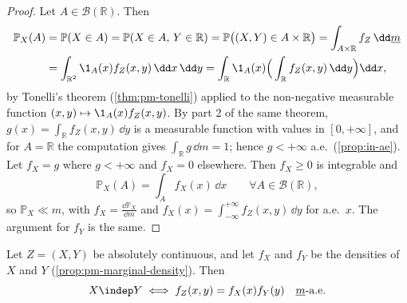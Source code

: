 \begin{proof}
Let $A\in\mathcal B(\mathbb R)$. Then
\[
\begin{aligned}
  \mathbb P_X(A)&=\mathbb P(X\in A)=\mathbb P(X\in A,\,Y\in\mathbb R)=\mathbb P\big((X,Y)\in A\times\mathbb R\big)
  =\int_{A\times\mathbb R}f_Z\,\dd\underline m\\
  &=\int_{\mathbb R^2}\1_A(x)f_Z(x,y)\,\dd x\,\dd y
  =\int_{\mathbb R}\1_A(x)\Big(\int_{\mathbb R}f_Z(x,y)\,\dd y\Big)\dd x,
\end{aligned}
\]
by Tonelli's theorem (\cref{thm:pm-tonelli}) applied to the non-negative measurable function
$(x,y)\mapsto\1_A(x)f_Z(x,y)$. By part 2 of the same theorem,
$g(x)=\int_{\mathbb R}f_Z(x,y)\,\dd y$ is a measurable function with values in $[0,+\infty]$, and
for $A=\mathbb R$ the computation gives $\int_{\mathbb R}g\,\dd m=1$; hence $g<+\infty$ a.e.\
(\cref{prop:in-ae}). Let $f_X=g$ where $g<+\infty$ and $f_X=0$ elsewhere. Then $f_X\ge0$ is
integrable and
\[
  \mathbb P_X(A)=\int_Af_X(x)\,\dd x\qquad\forall A\in\mathcal B(\mathbb R),
\]
so $\mathbb P_X\ll m$, with $f_X=\frac{\dd\mathbb P_X}{\dd m}$ and
$f_X(x)=\int_{-\infty}^{+\infty}f_Z(x,y)\,\dd y$ for a.e.\ $x$. The argument for $f_Y$ is the
same.
\end{proof}

\begin{proposition}\label{thm:pm-density-independence}
Let $Z=(X,Y)$ be absolutely continuous, and let $f_X$ and $f_Y$ be the densities of $X$ and
$Y$ (\cref{prop:pm-marginal-density}). Then
\[
  X\indep Y\iff f_Z(x,y)=f_X(x)f_Y(y)\quad\underline m\text{-a.e.}
\]
\end{proposition}

